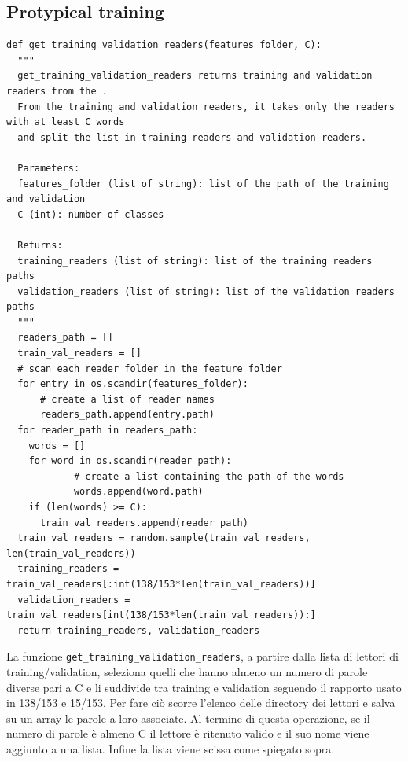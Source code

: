\documentclass[12pt,a4paper,titlepage]{article}
\begin{document}
\subsection{Protypical training}
\begin{lstlisting}[language=iPython,firstnumber=1, caption=get\_training\_validation\_readers, label=get_training_validation_readers,captionpos=b]
def get_training_validation_readers(features_folder, C):
  """
  get_training_validation_readers returns training and validation readers from the . 
  From the training and validation readers, it takes only the readers with at least C words
  and split the list in training readers and validation readers.

  Parameters:
  features_folder (list of string): list of the path of the training and validation
  C (int): number of classes

  Returns:
  training_readers (list of string): list of the training readers paths
  validation_readers (list of string): list of the validation readers paths
  """
  readers_path = []
  train_val_readers = []
  # scan each reader folder in the feature_folder
  for entry in os.scandir(features_folder):
      # create a list of reader names
      readers_path.append(entry.path)
  for reader_path in readers_path:
    words = []
    for word in os.scandir(reader_path):
            # create a list containing the path of the words
            words.append(word.path)
    if (len(words) >= C):
      train_val_readers.append(reader_path)
  train_val_readers = random.sample(train_val_readers, len(train_val_readers))
  training_readers = train_val_readers[:int(138/153*len(train_val_readers))]
  validation_readers = train_val_readers[int(138/153*len(train_val_readers)):]
  return training_readers, validation_readers
\end{lstlisting}
La funzione \texttt{get\_training\_validation\_readers}, a partire dalla lista di lettori di training/validation, seleziona quelli che hanno almeno un numero di parole diverse pari a C e li suddivide tra training e validation seguendo il rapporto usato in \cite{Salamon:Few-Shot} 138/153 e 15/153.
Per fare ciò scorre l'elenco delle directory dei lettori e salva su un array le parole a loro associate. Al termine di questa operazione, se il numero di parole è almeno C il lettore è ritenuto valido e il suo nome viene aggiunto a una lista. Infine la lista viene scissa come spiegato sopra.
\end{document}
